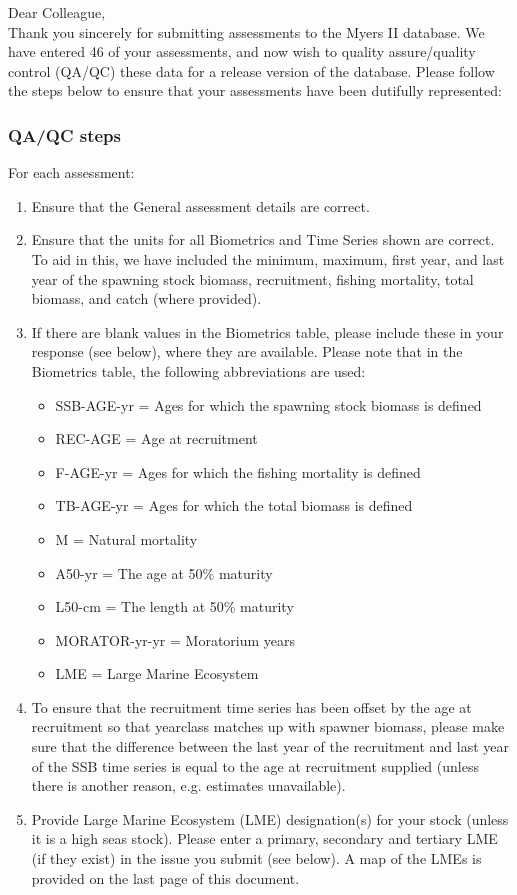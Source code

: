 \documentclass [a4paper, 10pt] {article}
\begin{document}
\noindent Dear Colleague,\\

\noindent Thank you sincerely for submitting assessments to the Myers II database. We have entered 46 of your assessments, and now wish to quality assure/quality control (QA/QC) these data for a release version of the database. Please follow the steps below to ensure that your assessments have been dutifully represented:
\subsubsection{QA/QC steps}
For each assessment:
\begin{enumerate}
\item Ensure that the General assessment details are correct.
\item Ensure that the units for all Biometrics and Time Series shown are correct. To aid in this, we have included the minimum, maximum, first year, and last year of the spawning stock biomass, recruitment, fishing mortality, total biomass, and  catch  (where provided). 
\item If there are blank values in the Biometrics table, please include these in your response (see below), where they are available.
Please note that in the Biometrics table, the following abbreviations are used:
\begin{itemize}
\item SSB-AGE-yr  = Ages for which the spawning stock biomass is defined
\item REC-AGE     = Age at recruitment
\item F-AGE-yr    = Ages for which the fishing mortality is defined 
\item TB-AGE-yr   = Ages for which the total biomass is defined
\item M      = Natural mortality
\item A50-yr      = The age at 50\% maturity
\item L50-cm      = The length at 50\% maturity
\item MORATOR-yr-yr = Moratorium years
\item LME = Large Marine Ecosystem\\
\end{itemize}
\item To ensure that the recruitment time series has been offset by the age at recruitment so that yearclass matches up with spawner biomass, please make sure that the difference between the last year of the recruitment and last year of the SSB time series is equal to the age at recruitment supplied (unless there is another reason, e.g. estimates unavailable). 
\item Provide Large Marine Ecosystem (LME) designation(s) for your stock (unless it is a high seas stock). Please enter a primary, secondary and tertiary LME (if they exist) in the issue you submit (see below). A map of the LMEs is provided on the last page of this document. 
\end{enumerate}
\vspace{-.25in}
\end{document}
